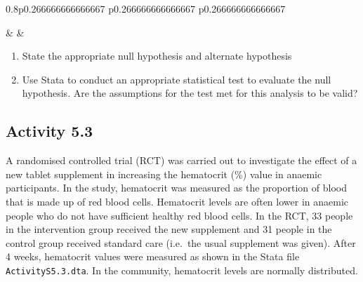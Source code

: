 \documentclass[
]{memoir}
\providecommand{\tightlist}{%
  \setlength{\itemsep}{0pt}\setlength{\parskip}{0pt}}
\begin{document}
\begin{table}[ht]
\begin{centerbox}
\begin{threeparttable}
\begin{tabularx}{0.8\textwidth}{p{} p{} p{}}
\hhline{}

 &
 &
 \tabularnewline[-0.5pt]


\end{tabularx}
\end{threeparttable}\par\end{centerbox}

\end{table}
 

\begin{enumerate}
\def\labelenumi{\alph{enumi})}
\tightlist
\item
  State the appropriate null hypothesis and alternate hypothesis
\item
  Use Stata to conduct an appropriate statistical test to evaluate the null hypothesis. Are the assumptions for the test met for this analysis to be valid?
\end{enumerate}

\hypertarget{activity-5.3}{%
\subsection*{Activity 5.3}\label{activity-5.3}}

A randomised controlled trial (RCT) was carried out to investigate the effect of a new tablet supplement in increasing the hematocrit (\%) value in anaemic participants. In the study, hematocrit was measured as the proportion of blood that is made up of red blood cells. Hematocrit levels are often lower in anaemic people who do not have sufficient healthy red blood cells. In the RCT, 33 people in the intervention group received the new supplement and 31 people in the control group received standard care (i.e.~the usual supplement was given). After 4 weeks, hematocrit values were measured as shown in the Stata file \texttt{ActivityS5.3.dta}. In the community, hematocrit levels are normally distributed.
\end{document}
